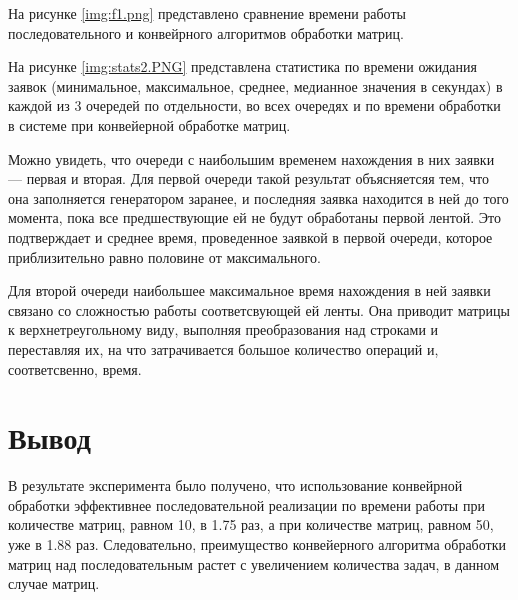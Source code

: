 На рисунке \ref{img:f1.png} представлено сравнение времени работы последовательного и конвейрного алгоритмов обработки матриц.


На рисунке \ref{img:stats2.PNG} представлена статистика по времени ожидания заявок (минимальное, максимальное, среднее, медианное значения в секундах) в каждой из 3 очередей по отдельности, во всех очередях и по времени обработки в системе при конвейерной обработке матриц.


Можно увидеть, что очереди с наибольшим временем нахождения в них заявки --- первая и вторая. Для первой очереди такой
результат объясняетсяя тем, что она заполняется генератором заранее, и последняя заявка находится в ней до того момента, пока все предшествующие ей не будут обработаны первой лентой. Это подтверждает и среднее время, проведенное заявкой в первой очереди, которое приблизительно равно половине от максимального.

Для второй очереди наибольшее максимальное время нахождения в ней заявки связано со сложностью работы соответсвующей ей ленты. Она приводит матрицы к верхнетреугольному виду, выполняя преобразования над строками и переставляя их, на что затрачивается большое количество операций и, соответсвенно, время. 

\section*{Вывод}
В результате эксперимента было получено, что использование конвейрной обработки эффективнее последовательной реализации по времени работы при количестве матриц, равном 10, в 1.75 раз, а при количестве матриц, равном 50, уже в 1.88 раз. Следовательно, преимущество конвейерного алгоритма обработки матриц над последовательным растет с увеличением количества задач, в данном случае матриц.
